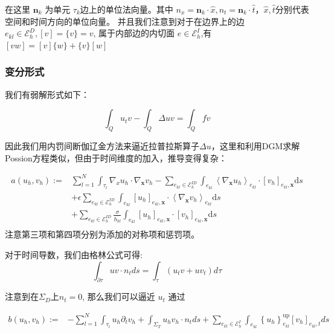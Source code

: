 在这里 $\textbf{n}_k$ 为单元 $\tau_k$边上的单位法向量。其中 $n_x=\textbf{n}_k\cdot \hat{x}, n_t=\textbf{n}_k\cdot \hat{t}$，$\hat{x},\hat{t}$分别代表空间和时间方向的单位向量。
并且我们注意到对于在边界上的边 $e_{kl}\in \mathscr{E}_h^D,[v]=\{v\}=v$, 属于内部边的内切面 $e\in \mathscr{E}_h^I$,有$[vw]=[v]\{w\}+\{v\}[w]$

\subsubsection*{变分形式}

我们有弱解形式如下：

\begin{equation}
    \int_Qu_tv-\int_Q\Delta uv = \int_Q fv
\end{equation}

因此我们用内罚间断伽辽金方法来逼近拉普拉斯算子$\Delta u$，这里和利用DGM求解Possion方程类似，但由于时间维度的加入，推导变得复杂：

\begin{equation}\label{auv}
    \begin{aligned}
        a\left(u_{h}, v_{h}\right):=  &\sum_{l=1}^{N} \int_{\tau_{l}} \nabla_{x} u_{h} \cdot \nabla_{\boldsymbol{x}} v_{h} 
         -\sum_{e_{k l} \in \mathscr{E}_h^{ID}} \int_{e_{k l}}\left\langle\nabla_{\boldsymbol{x}} u_{h}\right\rangle_{e_{k l}} \cdot\left[v_{h}\right]_{e_{k l}, \boldsymbol{x}} \mathrm{d} s \\
        & +\epsilon\sum_{e_{k l} \in \mathscr{E}_h^{ID}} \int_{e_{k l}}\left[u_{h}\right]_{e_{k l}, \boldsymbol{x}} \cdot\left\langle\nabla_{\boldsymbol{x}} v_{h}\right\rangle_{e_{k l}} \mathrm{d} s \\
        & +\sum_{e_{k l} \in \mathscr{E}_h^{ID}} \frac{\sigma}{\overline{h_{k l}}} \int_{e_{k l}}\left[u_{h}\right]_{e_{k l}, \boldsymbol{x}} \cdot\left[v_{h}\right]_{e_{k l}, \boldsymbol{x}} \mathrm{d} s\\
    \end{aligned}
\end{equation}
注意第三项和第四项分别为添加的对称项和惩罚项。

对于时间导数，我们由格林公式可得:
$$\int_{\partial \tau}uv \cdot n_t ds = \int_\tau (u_tv+uv_t)d\tau$$

注意到在$\Sigma_D$上$n_t=0$, 那么我们可以逼近 $u_t$ 通过

\begin{equation}\label{buv}
    \begin{aligned}
        b\left(u_{h}, v_{h}\right):= &-\sum_{l=1}^{N} \int_{\tau_{l}} u_{h} \partial_{t} v_{h} +\int_{\Sigma_{T}} u_{h} v_{h} \cdot n_t ds  
         +\sum_{e_{k l} \in \mathscr{E}_h^{I}}\int_{e_{k l}}\left\{u_{h}\right\}_{e_{k l}}^{\mathrm{up}}\left[v_{h}\right]_{e_{k l}, t} ds
    \end{aligned}
\end{equation}

